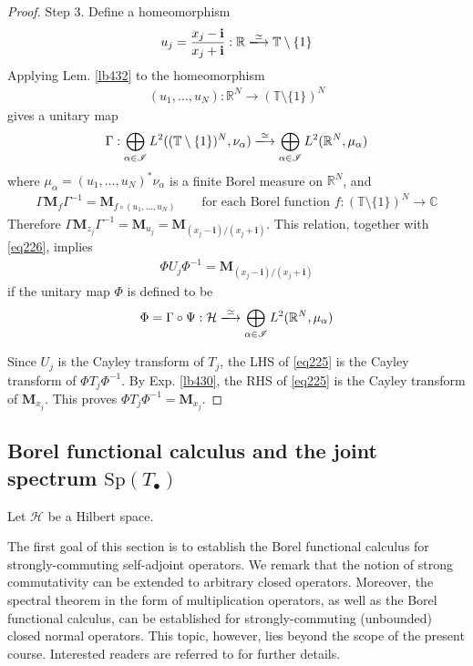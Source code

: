 \documentclass[12pt,b5paper,notitlepage]{article}
\theoremstyle{definition}
\theoremstyle{plain}
\newcommand{\im}{\mathbf{i}}
\newcommand{\blt}{\bullet}
\newcommand{\Cbb}{\mathbb C}
\newcommand{\Rbb}{\mathbb R}
\newcommand{\Tbb}{\mathbb T}
\newcommand{\Sp}{\mathrm{Sp}}
\newcommand{\MH}{\mathcal H}
\newcommand{\SI}{\mathscr I}
\newcommand{\Mbf}{\mathbf M}
\numberwithin{equation}{section}
\begin{document}
\begin{proof}
Step 3. Define a homeomorphism
\begin{align*}
u_j=\frac{x_j-\im}{x_j+\im}:\Rbb\xlongrightarrow{\simeq}\Tbb\setminus\{1\}
\end{align*}
Applying Lem. \ref{lb432} to the homeomorphism
\begin{align*}
(u_1,\dots,u_N):\Rbb^N\rightarrow (\Tbb\setminus\{1\})^N
\end{align*}
gives a unitary map
\begin{align*}
\Gamma:\bigoplus_{\alpha\in\SI}L^2((\Tbb\setminus\{1\})^N,\nu_\alpha)\xlongrightarrow{\simeq}\bigoplus_{\alpha\in\SI}L^2(\Rbb^N,\mu_\alpha)
\end{align*}
where $\mu_\alpha=(u_1,\dots,u_N)^*\nu_\alpha$ is a finite Borel measure on $\Rbb^N$, and
\begin{align*}
\Gamma\Mbf_f \Gamma^{-1}=\Mbf_{f\circ(u_1,\dots,u_N)}\qquad\text{for each Borel function }f:(\Tbb\setminus\{1\})^N\rightarrow\Cbb
\end{align*}
Therefore $\Gamma\Mbf_{z_j}\Gamma^{-1}=\Mbf_{u_j}=\Mbf_{(x_j-\im)/(x_j+\im)}$. This relation, together with \eqref{eq226}, implies
\begin{align}\label{eq225}
\Phi U_j\Phi^{-1}=\Mbf_{(x_j-\im)/(x_j+\im)}
\end{align}
if the unitary map $\Phi$ is defined to be
\begin{align*}
\Phi=\Gamma\circ\Psi:\MH\xlongrightarrow{\simeq}\bigoplus_{\alpha\in\SI}L^2(\Rbb^N,\mu_\alpha)
\end{align*}

Since $U_j$ is the Cayley transform of $T_j$, the LHS of \eqref{eq225} is the Cayley transform of $\Phi T_j\Phi^{-1}$. By Exp. \ref{lb430}, the RHS of \eqref{eq225} is the Cayley transform of $\Mbf_{x_j}$. This proves $\Phi T_j\Phi^{-1}=\Mbf_{x_j}$.
\end{proof}


\subsection{Borel functional calculus and the joint spectrum $\Sp(T_\blt)$}

Let $\MH$ be a Hilbert space.

The first goal of this section is to establish the Borel functional calculus for strongly-commuting self-adjoint operators. We remark that the notion of strong commutativity can be extended to arbitrary closed operators. Moreover, the spectral theorem in the form of multiplication operators, as well as the Borel functional calculus, can be established for strongly-commuting (unbounded) closed normal operators. This topic, however, lies beyond the scope of the present course. Interested readers are referred to \cite{Gui-S} for further details.
\end{document}
